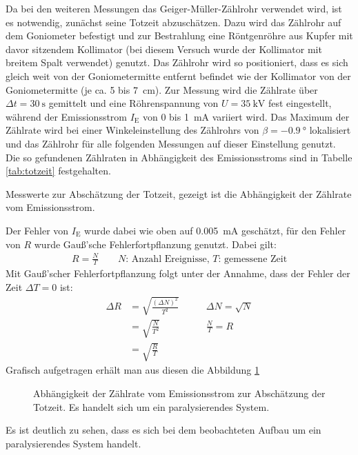 \documentclass[11pt, a4paper]{article}
\numberwithin{equation}{section}
\begin{document}
Da bei den weiteren Messungen das Geiger-Müller-Zählrohr verwendet wird, ist es notwendig, zunächst seine Totzeit abzuschätzen.
Dazu wird das Zählrohr auf dem Goniometer befestigt und zur Bestrahlung eine Röntgenröhre aus Kupfer mit davor sitzendem Kollimator (bei diesem Versuch wurde der Kollimator mit breitem Spalt verwendet) genutzt.
Das Zählrohr wird so positioniert, dass es sich gleich weit von der Goniometermitte entfernt befindet wie der Kollimator von der Goniometermitte (je ca. \num{5} bis \SI{7}{cm}).
Zur Messung wird die Zählrate über $\Delta t=\SI{30}{\second}$ gemittelt und eine Röhrenspannung von $U=\SI{35}{\kilo\volt}$ fest eingestellt, während der Emissionsstrom $I_\text{E}$ von \num{0} bis \SI{1}{\milli\ampere} variiert wird.
Das Maximum der Zählrate wird bei einer Winkeleinstellung des Zählrohrs von $\beta=\SI{-0.9}{\degree}$ lokalisiert und das Zählrohr für alle folgenden Messungen auf dieser Einstellung genutzt.
Die so gefundenen Zählraten in Abhängigkeit des Emissionsstroms sind in Tabelle \ref{tab:totzeit} festgehalten.
\begin{table}[ht]
	\centering
	
	\caption{Messwerte zur Abschätzung der Totzeit, gezeigt ist die Abhängigkeit der Zählrate vom Emissionsstrom.}
	\label{tab:totzeit}
\end{table}
Der Fehler von $I_\text{E}$ wurde dabei wie oben auf \SI{0.005}{\milli\ampere} geschätzt, für den Fehler von $R$ wurde Gauß'sche Fehlerfortpflanzung genutzt.
Dabei gilt:
\begin{align}
	R = \frac{N}{T}\qquad\text{$N$: Anzahl Ereignisse, $T$: gemessene Zeit}
\end{align}
Mit Gauß'scher Fehlerfortpflanzung folgt unter der Annahme, dass der Fehler der Zeit $\Delta T=0$ ist:
\begin{align}
	\Delta R &= \sqrt{\frac{(\Delta N)^2}{T^2}} &\qquad \Delta N =\sqrt{N} \\
				 &= \sqrt{\frac{N}{T^2}} &\qquad \frac{N}{T}= R\\
				 &= \sqrt{\frac{R}{T}} \label{eq:zählrate_fehler}
\end{align}
Grafisch aufgetragen erhält man aus diesen die Abbildung \ref{fig:totzeit}
\begin{figure}[ht]
	\centering
	
	\caption{Abhängigkeit der Zählrate vom Emissionsstrom zur Abschätzung der Totzeit. Es handelt sich um ein paralysierendes System.}
	\label{fig:totzeit}
\end{figure}
Es ist deutlich zu sehen, dass es sich bei dem beobachteten Aufbau um ein paralysierendes System handelt.
\end{document}
